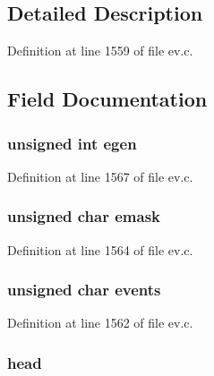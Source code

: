 \subsection{\-Detailed \-Description}


\-Definition at line 1559 of file ev.\-c.



\subsection{\-Field \-Documentation}
\hypertarget{struct_a_n_f_d_ae3d672a0de46c808d2bae5a187b54478}{
\subsubsection[{egen}]{\setlength{\rightskip}{0pt plus 5cm}unsigned int {\bf egen}}}\label{struct_a_n_f_d_ae3d672a0de46c808d2bae5a187b54478}


\-Definition at line 1567 of file ev.\-c.

\hypertarget{struct_a_n_f_d_acfe97a2a9e6eb619c00317e774f11b76}{
\subsubsection[{emask}]{\setlength{\rightskip}{0pt plus 5cm}unsigned char {\bf emask}}}\label{struct_a_n_f_d_acfe97a2a9e6eb619c00317e774f11b76}


\-Definition at line 1564 of file ev.\-c.

\hypertarget{struct_a_n_f_d_a6afb9ac2ccc07c1c5c4adb0ba40fe303}{
\subsubsection[{events}]{\setlength{\rightskip}{0pt plus 5cm}unsigned char {\bf events}}}\label{struct_a_n_f_d_a6afb9ac2ccc07c1c5c4adb0ba40fe303}


\-Definition at line 1562 of file ev.\-c.

\hypertarget{struct_a_n_f_d_adfe98a723723ae76746a9a793f2bd862}{
\subsubsection[{head}]{ {\bf head}}}\label{struct_a_n_f_d_adfe98a723723ae76746a9a793f2bd862}


